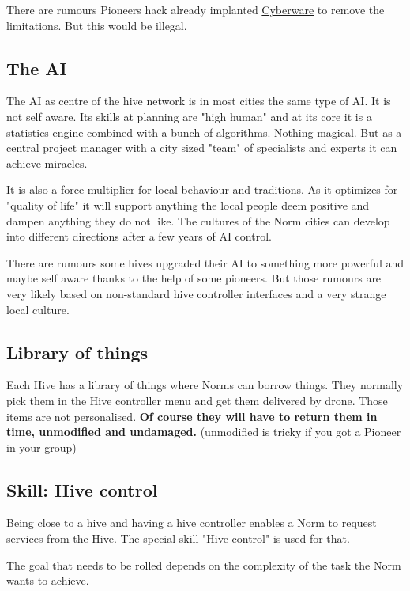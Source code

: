 There are rumours Pioneers hack already implanted \hyperref[sec:Cyberware Pioneers]{Cyberware} to remove the limitations. But this would be illegal.


\subsection{The AI}

The AI as centre of the hive network is in most cities the same type of AI. It is not self aware. Its skills at planning are "high human" and at its core it is a statistics engine combined with a  bunch of algorithms. Nothing magical. But as a central project manager with a city sized "team" of specialists and experts it can achieve miracles.

It is also a force multiplier for local behaviour and traditions. As it optimizes for "quality of life" it will support anything the local people deem positive and dampen anything they do not like. The cultures of the Norm cities can develop into different directions after a few years of AI control.

There are rumours some hives upgraded their AI to something more powerful and maybe self aware thanks to the help of some pioneers. But those rumours are very likely based on non-standard hive controller interfaces and a very strange local culture.

\subsection{Library of things}

Each Hive has a library of things where Norms can borrow things. They normally pick them in the Hive controller menu and get them delivered by drone. Those items are not personalised. \textbf{Of course they will have to return them in time, unmodified and undamaged.} (unmodified is tricky if you got a Pioneer in your group)

\subsection{Skill: Hive control}
\label{sec:Hive control skill}

Being close to a hive and having a hive controller enables a Norm to request services from the Hive. The special skill "Hive control" is used for that.

The goal that needs to be rolled depends on the complexity of the task the Norm wants to achieve.

